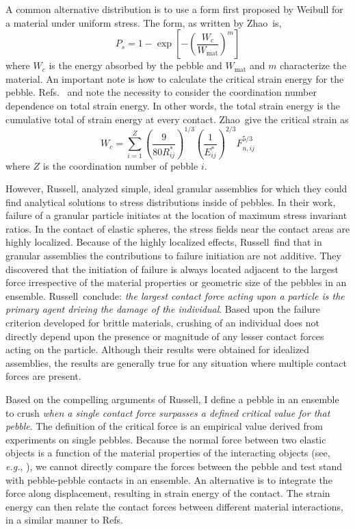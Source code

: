 A common alternative distribution is to use a form first proposed by Weibull for a material under uniform stress\cite{Kwok2013,Zhao2011,nakata1999probabilistic,Zhao2013,Pitchumani2004}. The form, as written by Zhao\etal~is,
\begin{equation}
	P_s = 1 - \exp\left[-\left(\frac{W_c}{W_\text{mat}}\right)^m\right]
\end{equation}
where $W_c$ is the energy absorbed by the pebble and $W_\text{mat}$ and $m$ characterize the material. An important note is how to calculate the critical strain energy for the pebble. Refs.~\cite{Marketos2007} and \cite{Zhao2011} note the necessity to consider the coordination number dependence on total strain energy. In other words, the total strain energy is the cumulative total of strain energy at every contact. Zhao\etal~give the critical strain as
\begin{equation}
	W_c = \sum_{i=1}^{Z}\left(\frac{9}{80 R_{ij}^*}\right)^{1/3} \left(\frac{1}{E_{ij}^*}\right)^{2/3} F_{n,ij}^{5/3}
\end{equation}
where $Z$ is the coordination number of pebble $i$. 

However, Russell\etal, analyzed simple, ideal granular assemblies for which they could find analytical solutions to stress distributions inside of pebbles.\cite{Russell2009} In their work, failure of a granular particle initiates at the location of maximum stress invariant ratios. In the contact of elastic spheres, the stress fields near the contact areas are highly localized. Because of the highly localized effects, Russell\etal~find that in granular assemblies the contributions to failure initiation are not additive. They discovered that the initiation of failure is always located adjacent to the largest force irrespective of the material properties or geometric size of the pebbles in an ensemble. Russell\etal~conclude: \emph{the largest contact force acting upon a particle is the primary agent driving the damage of the individual}.\cite{Russell2009} Based upon the failure criterion developed for brittle materials, crushing of an individual does not directly depend upon the presence or magnitude of any lesser contact forces acting on the particle. Although their results were obtained for idealized assemblies, the results are generally true for any situation where multiple contact forces are present.




Based on the compelling arguments of Russell\etal, I define a pebble in an ensemble to crush \emph{when a single contact force surpasses a defined critical value for that pebble}. The definition of the critical force is an empirical value derived from experiments on single pebbles. Because the normal force between two elastic objects is a function of the material properties of the interacting objects (see, \textit{e.g.}, ), we cannot directly compare the forces between the pebble and test stand with pebble-pebble contacts in an ensemble. An alternative is to integrate the force along displacement, resulting in strain energy of the contact. The strain energy can then relate the contact forces between different material interactions, in a similar manner to Refs\cite{Zhao2013,Annabattula2012a}.

